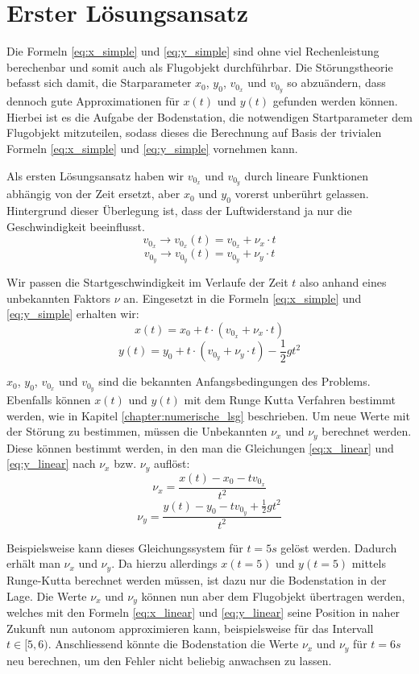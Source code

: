 \section{Erster Lösungsansatz
\label{perturbation:section:ersterloesungsansatz}}

Die Formeln \ref{eq:x_simple} und \ref{eq:y_simple} sind ohne viel Rechenleistung berechenbar und somit auch als Flugobjekt durchführbar. Die Störungstheorie befasst sich damit, die Starparameter $x_0$, $y_0$, $v_{0_x}$ und $v_{0_y}$ so abzuändern, dass dennoch gute Approximationen für $x(t)$ und $y(t)$ gefunden werden können. Hierbei ist es die Aufgabe der Bodenstation, die notwendigen Startparameter dem Flugobjekt mitzuteilen, sodass dieses die Berechnung auf Basis der trivialen Formeln \ref{eq:x_simple} und \ref{eq:y_simple} vornehmen kann.

Als ersten Lösungsansatz haben wir $v_{0_x}$ und $v_{0_y}$ durch lineare Funktionen abhängig von der Zeit ersetzt, aber $x_0$ und $y_0$ vorerst unberührt gelassen. Hintergrund dieser Überlegung ist, dass der Luftwiderstand ja nur die Geschwindigkeit beeinflusst.
\[
v_{0_x} \rightarrow v_{0_x}(t) = v_{0_x} + \nu_x \cdot t
\]
\[
v_{0_y} \rightarrow v_{0_y}(t) = v_{0_y} + \nu_y \cdot t
\]

Wir passen die Startgeschwindigkeit im Verlaufe der Zeit $t$ also anhand eines unbekannten Faktors $\nu$ an. Eingesetzt in die Formeln \ref{eq:x_simple} und \ref{eq:y_simple} erhalten wir:
\begin{equation}\label{eq:x_linear}
    x(t) = x_0 + t \cdot (v_{0_x} + \nu_x \cdot t)
\end{equation}
\begin{equation}\label{eq:y_linear}
    y(t) = y_0 + t \cdot (v_{0_y} + \nu_y \cdot t) - \frac{1}{2}gt^2
\end{equation}

$x_0$, $y_0$, $v_{0_x}$ und $v_{0_y}$ sind die bekannten Anfangsbedingungen des Problems. Ebenfalls können $x(t)$ und $y(t)$ mit dem Runge Kutta Verfahren bestimmt werden, wie in Kapitel \ref{chapter:numerische_lsg} beschrieben. Um neue Werte mit der Störung zu bestimmen, müssen die Unbekannten $\nu_x$ und $\nu_y$ berechnet werden. Diese können bestimmt werden, in den man die Gleichungen \ref{eq:x_linear} und \ref{eq:y_linear} nach $\nu_x$ bzw. $\nu_y$ auflöst:
\[
\nu_x = \frac{x(t) - x_0 - tv_{0_x}}{t^2}
\]
\[
\nu_y = \frac{y(t) - y_0 - tv_{0_y} + \frac{1}{2}gt^2}{t^2}
\]

Beispielsweise kann dieses Gleichungssystem für $t = 5s$ gelöst werden. Dadurch erhält man $\nu_x$ und $\nu_y$. Da hierzu allerdings $x(t=5)$ und $y(t=5)$ mittels Runge-Kutta berechnet werden müssen, ist dazu nur die Bodenstation in der Lage. Die Werte $\nu_x$ und $\nu_y$ können nun aber dem Flugobjekt übertragen werden, welches mit den Formeln \ref{eq:x_linear} und \ref{eq:y_linear} seine Position in naher Zukunft nun autonom approximieren kann, beispielsweise für das Intervall $t \in [5,6)$. Anschliessend könnte die Bodenstation die Werte $\nu_x$ und $\nu_y$ für $t=6s$ neu berechnen, um den Fehler nicht beliebig anwachsen zu lassen.

